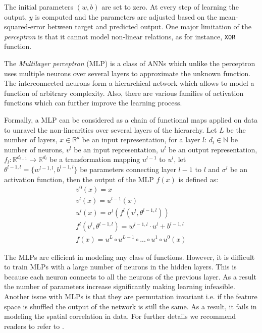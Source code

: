 The initial parameters $(w,b)$ are set to zero. At every step of learning the output, $y$ is computed and the parameters are adjusted based on the mean-squared-error between target and predicted output. One major limitation of the \emph{perceptron} is that it cannot model non-linear relations, as for instance, \texttt{XOR} function. 

The \emph{Multilayer perceptron} (MLP) is a class of ANNs which unlike the perceptron uses multiple neurons over several layers to approximate the unknown function. The interconnected neurons form a hierarchical network which allows to model a function of arbitrary complexity. Also, there are various families of activation functions which can further improve the learning process.

Formally, a MLP can be considered as a chain of functional maps applied on data to unravel the non-linearities over several layers of the hierarchy. Let $L$ be the number of layers, $x\in\mathbb{R}^d$ be an input representation, for a layer $l$: $d_l\in\mathbb{N}$ be number of neurons, $v^{l}$ be an input representation, $u^{l}$ be an output representation, $f_l:\mathbb{R}^{d_{l-1}}
\rightarrow\mathbb{R}^{d_{l}}$ be a transformation mapping $u^{l-1}$ to  $u^l$, let $\theta^{l-1,l}=\{w^{l-1,l},b^{l-1,l}\}$ be parameters connecting layer $l-1$ to $l$ and $\sigma^{l}$ be an activation function, then the output of the MLP $f(x)$ is defined as:
\begin{equation}
\label{eq:mlp}
\begin{aligned}
    v^{0}(x) = x\\
    v^{l}(x) = u^{l-1}(x)\\
    u^{l}(x) = \sigma^l(f^{l}(v^{l},\theta^{l-1, l}))\\
    f^{l}(v^{l},\theta^{l-1, l}) = w^{l-1, l}\cdot u^{l}+b^{l-1,l}\\
    f(x) = u^{L}\circ u^{L-1}\circ...\circ u^{1}\circ u^{0}(x)
\end{aligned}
\end{equation}

The MLPs are efficient in modeling any class of functions. However, it is difficult to train MLPs with a large number of neurons in the hidden layers. This is because each neuron connects to all the neurons of the previous layer. As a result the number of parameters increase significantly making learning infeasible. Another issue with MLPs is that they are permutation invariant i.e. if the feature space is shuffled the output of the network is still the same. As a result, it fails in modeling the spatial correlation in data. For further details we recommend readers to refer to \citet{Goodfellow-et-al-2016}.


